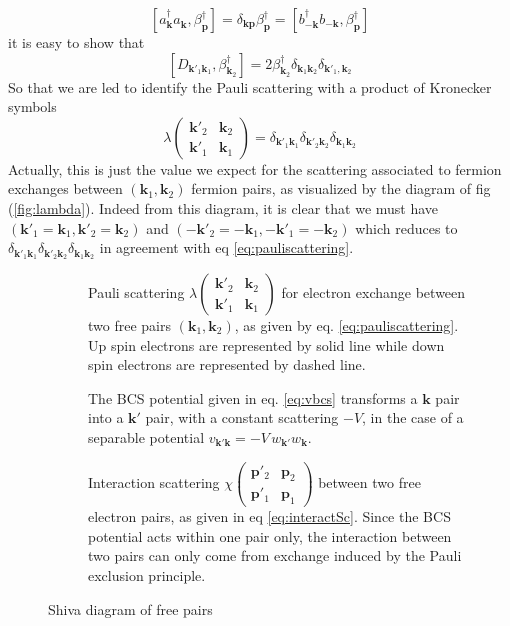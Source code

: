 \documentclass[aps,prb,amsmath,amssymb,superscriptaddress,twocolumn]{revtex4-1}
\newcommand{\vk}{\ensuremath{\mathbf{k}}}
\newcommand{\vp}{\ensuremath{\mathbf{p}}}
\newcommand{\br}[1]{\ensuremath{\left(#1\right)}}
\newcommand{\mbr}[1]{\ensuremath{\left[#1\right]}}
\newcommand{\fmtrx}[4]{\ensuremath{\br{\begin{smallmatrix}#1&#2\\#3&#4\end{smallmatrix}}}}
\newcommand{\com}[2]{\ensuremath{\mbr{#1,#2}}}
\newcommand{\D}{\ensuremath{\mathit{D}}}
\begin{document}
\begin{equation}\label{eq:aBeta}
\com{a^{\dagger}_{\vk}a^{}_{\vk}}{\beta^{\dagger}_{\vp}}=\delta_{\vk\vp}\beta^{\dagger}_{\vp}=\com{b^{\dagger}_{-\vk}b^{}_{-\vk}}{\beta^{\dagger}_{\vp}}
\end{equation}
it is easy to show that 
\begin{equation}\label{eq:Dcom}
\com{\D_{\vk'_1\vk_1}}{\beta^{\dagger}_{\vk_2}}=2\beta^{\dagger}_{\vk_2}\delta_{\vk_1\vk_2}\delta_{\vk'_1,\vk_2}
\end{equation}
So that we are led to identify the Pauli scattering with a product of Kronecker symbols 
\begin{equation}\label{eq:pauliscattering}
\lambda\fmtrx{\vk'_2}{\vk_2}{\vk'_1}{\vk_1}=\delta_{\vk'_1\vk_1}\delta_{\vk'_2\vk_2}\delta_{\vk_1\vk_2}
\end{equation}
Actually, this is just the value we expect for  the scattering associated to fermion exchanges between $\br{\vk_1,\vk_2}$ fermion pairs, as visualized by the diagram of fig (\ref{fig:lambda}). Indeed from this diagram, it is clear that we must have $\br{\vk'_1=\vk_1,\vk'_2=\vk_2}$ and $\br{-\vk'_2=-\vk_1,-\vk'_1=-\vk_2}$ which reduces to $\delta_{\vk'_1\vk_1}\delta_{\vk'_2\vk_2}\delta_{\vk_1\vk_2}$ in agreement with eq \eqref{eq:pauliscattering}.
 
\begin{figure}[htb]
 \centering

 \caption{Shiva diagram of free pairs }


 \begin{description}
 
 \item[] Pauli scattering $\lambda\fmtrx{\vk'_2}{\vk_2}{\vk'_1}{\vk_1}$ for electron exchange between two free pairs $\br{\vk_1,\vk_2}$, as given by eq. \eqref{eq:pauliscattering}. Up spin electrons are represented by solid line while down spin electrons are represented by dashed line.
 \item[] The BCS potential given in eq. \eqref{eq:vbcs} transforms a $\vk$ pair into a $\vk'$ pair, with a constant scattering $-V$, in the case of a separable potential $v_{\vk'\vk}=-V\,w_{\vk'}w_{\vk}$. 
 
 \item[] Interaction scattering  $\chi\fmtrx{\vp'_2}{\vp_2}{\vp'_1}{\vp_1}$ between two free electron pairs, as given in eq \eqref{eq:interactSc}. Since the BCS potential acts within one pair only, the interaction between two pairs can only come from exchange induced by the Pauli exclusion principle.
 \end{description} 


 \end{figure}
\end{document}
